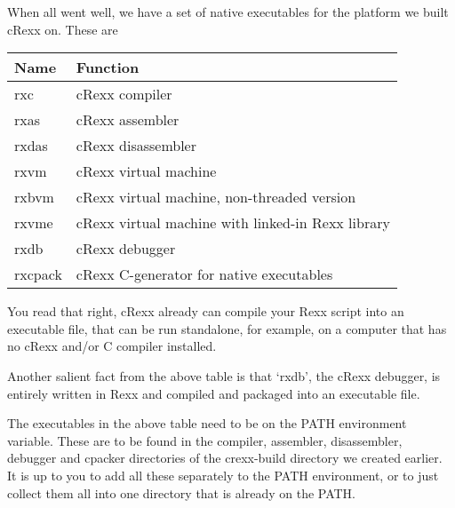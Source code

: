 When all went well, we have a set of native executables for the platform
we built cRexx on. These are

\begin{longtable}[]{@{}ll@{}}
\toprule()
Name & Function \\
\midrule()
\endhead
rxc & cRexx compiler \\
rxas & cRexx assembler \\
rxdas & cRexx disassembler \\
rxvm & cRexx virtual machine \\
rxbvm & cRexx virtual machine, non-threaded version \\
rxvme & cRexx virtual machine with linked-in Rexx library \\
rxdb & cRexx debugger \\
rxcpack & cRexx C-generator for native executables \\
\bottomrule()
\end{longtable}

You read that right, cRexx already can compile your Rexx script into an
executable file, that can be run standalone, for example, on a computer
that has no cRexx and/or C compiler installed.

Another salient fact from the above table is that `rxdb', the cRexx
debugger, is entirely written in Rexx and compiled and packaged into an
executable file.

The executables in the above table need to be on the PATH environment
variable. These are to be found in the compiler, assembler,
disassembler, debugger and cpacker directories of the crexx-build
directory we created earlier. It is up to you to add all these
separately to the PATH environment, or to just collect them all into one
directory that is already on the PATH.
